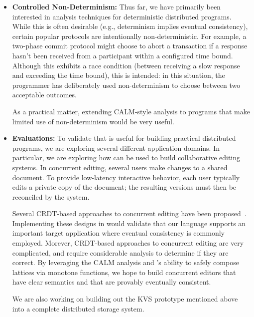 \begin{itemize}
\item \textbf{Controlled Non-Determinism:} Thus far, we have primarily been
  interested in analysis techniques for deterministic distributed
  programs. While this is often desirable (e.g., determinism implies eventual
  consistency), certain popular protocols are intentionally
  non-deterministic. For example, a two-phase commit protocol might choose to
  abort a transaction if a response hasn't been received from a participant
  within a configured time bound. Although this exhibits a race condition
  (between receiving a slow response and exceeding the time bound), this is
  intended: in this situation, the programmer has deliberately used
  non-determinism to choose between two acceptable outcomes. 

  As a practical matter, extending CALM-style analysis to programs that make
  limited use of non-determinism would be very useful.

\item \textbf{Evaluations:} To validate that \blooml is useful for building
  practical distributed programs, we are exploring several different application
  domains. In particular, we are exploring how \blooml can be used to build
  collaborative editing systems. In concurrent editing, several users make
  changes to a shared document. To provide low-latency interactive behavior,
  each user typically edits a private copy of the document; the resulting
  versions must then be reconciled by the system.

  Several CRDT-based approaches to concurrent editing have been
  proposed~\cite{Oster2006,Preguica2009,Weiss2009,Weiss2010}. Implementing these designs
  in \blooml would validate that our language supports an important target
  application where eventual consistency is commonly employed. Morever,
  CRDT-based approaches to concurrent editing are very complicated, and require
  considerable analysis to determine if they are correct. By leveraging the CALM
  analysis and \blooml's ability to safely compose lattices via monotone
  functions, we hope to build concurrent editors that have clear semantics and
  that are provably eventually consistent.

  We are also working on building out the KVS prototype mentioned above into a
  complete distributed storage system.  
\end{itemize}

